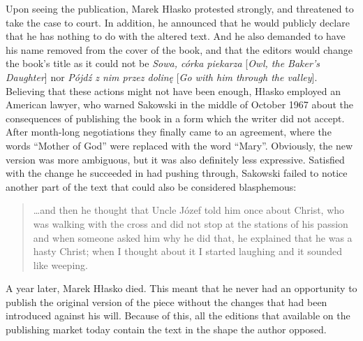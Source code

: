 \begin{paper}
Upon seeing the publication, Marek Hłasko protested strongly, and threatened to take the case to court. In addition, he announced that he would publicly
declare that he has nothing to do with the altered text. And he also
demanded to have his name removed from the cover of the book, and that the editors would
change the book's title as it could not be \emph{Sowa, córka piekarza
}{[}\emph{Owl, the Baker's Daughter}{]}\emph{ }nor \emph{Pójdź z nim przez
dolinę }{[}\emph{Go with him through the valley}{]}. Believing that
these actions might not have been enough, Hłasko employed an American
lawyer, who warned Sakowski in the middle of October 1967  about the
consequences of publishing the book in a form which the writer did not
accept. After month-long negotiations they finally came to an agreement, where  the
words ``Mother of God'' were replaced with the word ``Mary''. Obviously, the new
version was more ambiguous, but it was also definitely less expressive.
Satisfied with the change he succeeded in had pushing through, Sakowski failed
to notice another part of the text that could also be considered blasphemous:

\begin{quote}
\ldots{}and then he thought that Uncle Józef told him once about
Christ, who was walking with the cross and did not stop at the stations
of his passion and when someone asked him why he did that, he explained
that he was a hasty Christ; when I thought about it I started laughing
and it sounded like weeping.
\end{quote}

\noindent A year later, Marek Hłasko died. This meant that he never had an
opportunity to publish the original version of the piece without the
changes that had been introduced against his
will. Because of this, all the editions that available on the publishing
market today contain the text in the shape the author opposed.


\end{paper}
